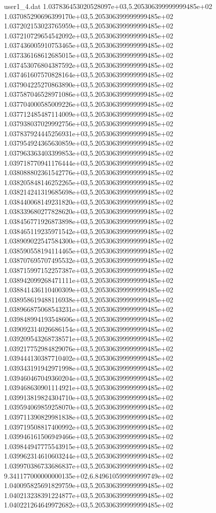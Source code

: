 \begin{filecontents}{user1_4.dat}
1.037836453020528097e+03,5.205306399999999485e+02
1.037085290696399170e+03,5.205306399999999485e+02
1.037202153023765959e+03,5.205306399999999485e+02
1.037210729654542092e+03,5.205306399999999485e+02
1.037436005910753465e+03,5.205306399999999485e+02
1.037336168612685015e+03,5.205306399999999485e+02
1.037453076804387592e+03,5.205306399999999485e+02
1.037461607570828164e+03,5.205306399999999485e+02
1.037904225270863890e+03,5.205306399999999485e+02
1.037587046528971086e+03,5.205306399999999485e+02
1.037704000585009226e+03,5.205306399999999485e+02
1.037712485487114009e+03,5.205306399999999485e+02
1.037938037029992756e+03,5.205306399999999485e+02
1.037837924445256931e+03,5.205306399999999485e+02
1.037954924365630859e+03,5.205306399999999485e+02
1.037963363403399853e+03,5.205306399999999485e+02
1.039718770941176444e+03,5.205306399999999485e+02
1.038088802361542776e+03,5.205306399999999485e+02
1.038205848146252265e+03,5.205306399999999485e+02
1.038214241319685698e+03,5.205306399999999485e+02
1.038440068149231820e+03,5.205306399999999485e+02
1.038339680277828620e+03,5.205306399999999485e+02
1.038456771926873898e+03,5.205306399999999485e+02
1.038465119235971542e+03,5.205306399999999485e+02
1.038909022547584300e+03,5.205306399999999485e+02
1.038590558194114465e+03,5.205306399999999485e+02
1.038707695707495532e+03,5.205306399999999485e+02
1.038715997152257387e+03,5.205306399999999485e+02
1.038942099268471111e+03,5.205306399999999485e+02
1.038841436110400309e+03,5.205306399999999485e+02
1.038958619488116938e+03,5.205306399999999485e+02
1.038966875068543231e+03,5.205306399999999485e+02
1.039848994193548606e+03,5.205306399999999485e+02
1.039092314026686154e+03,5.205306399999999485e+02
1.039209543268738571e+03,5.205306399999999485e+02
1.039217752984829076e+03,5.205306399999999485e+02
1.039444130387710402e+03,5.205306399999999485e+02
1.039343191942971998e+03,5.205306399999999485e+02
1.039460467049360204e+03,5.205306399999999485e+02
1.039468630901114921e+03,5.205306399999999485e+02
1.039913819824304710e+03,5.205306399999999485e+02
1.039594069859258070e+03,5.205306399999999485e+02
1.039711390829981838e+03,5.205306399999999485e+02
1.039719508817400992e+03,5.205306399999999485e+02
1.039946161506949466e+03,5.205306399999999485e+02
1.039844947775543915e+03,5.205306399999999485e+02
1.039962314610603244e+03,5.205306399999999485e+02
1.039970386733686837e+03,5.205306399999999485e+02
9.341177000000000135e+02,6.849610599999999749e+02
1.040095825691829759e+03,5.205306399999999485e+02
1.040213238391224877e+03,5.205306399999999485e+02
1.040221264649972682e+03,5.205306399999999485e+02

\end{filecontents}
